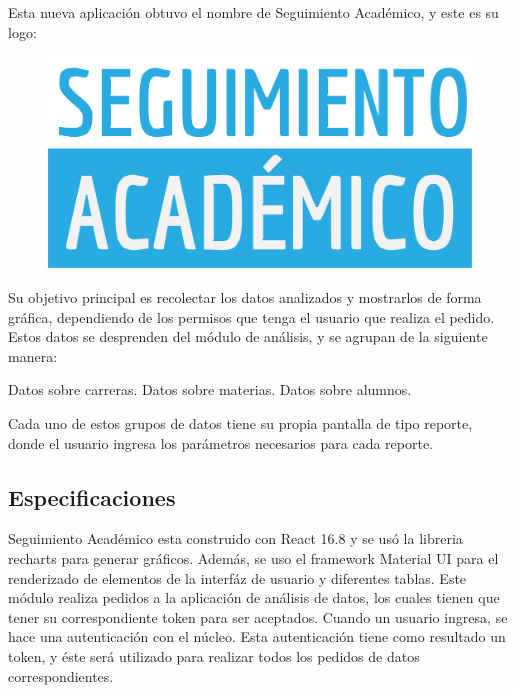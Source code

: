 Esta nueva aplicación obtuvo el nombre de Seguimiento Académico, y este es su logo:

\begin{figure}[h!]
  \centering
    \includegraphics[scale=0.5]{images/seguimiento-academico/seguimiento-academico-blanco.png}
  \label{fig:seguimiento-academico-logo}
\end{figure}

Su objetivo principal es recolectar los datos analizados y mostrarlos de forma gráfica, dependiendo de los permisos que tenga el usuario que realiza el pedido.
Estos datos se desprenden del módulo de análisis, y se agrupan de la siguiente manera:

\begin{outline}
\2 Datos sobre carreras.
\2 Datos sobre materias.
\2 Datos sobre alumnos.
\end{outline}

Cada uno de estos grupos de datos tiene su propia pantalla de tipo reporte, donde el usuario ingresa los parámetros necesarios para cada reporte.


\subsection{Especificaciones}

Seguimiento Académico esta construido con React 16.8 y se usó la libreria recharts para generar gráficos. Además, se uso el framework Material UI para el renderizado de elementos de la interfáz de usuario y diferentes tablas.
Este módulo realiza pedidos a la aplicación de análisis de datos, los cuales tienen que tener su correspondiente token para ser aceptados.
Cuando un usuario ingresa, se hace una autenticación con el núcleo. Esta autenticación tiene como resultado un token, y éste será utilizado para realizar todos los pedidos de datos correspondientes.

